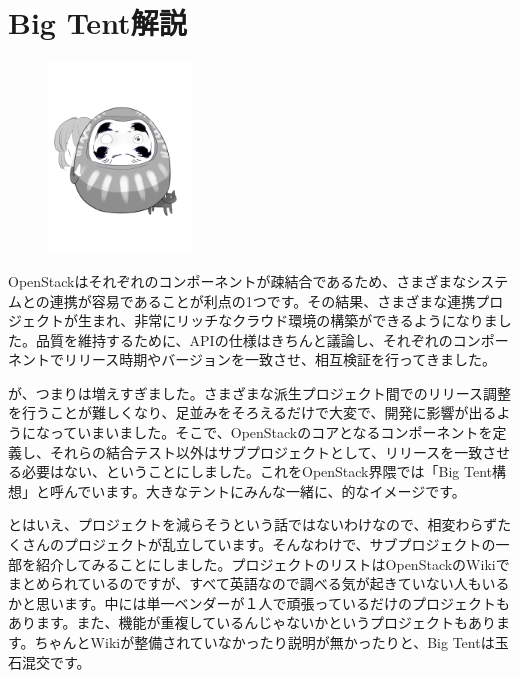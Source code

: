 \chapter{Big Tent解説}

\begin{figure}
	\vspace*{-14\intextsep}
	\begin{center}
		\includegraphics[width=0.34\textwidth]{img/daruma.png}
	\end{center}
\end{figure}

OpenStackはそれぞれのコンポーネントが疎結合であるため、さまざまなシステムとの連携が容易であることが利点の1つです。その結果、さまざまな連携プロジェクトが生まれ、非常にリッチなクラウド環境の構築ができるようになりました。品質を維持するために、APIの仕様はきちんと議論し、それぞれのコンポーネントでリリース時期やバージョンを一致させ、相互検証を行ってきました。

が、つまりは増えすぎました。さまざまな派生プロジェクト間でのリリース調整を行うことが難しくなり、足並みをそろえるだけで大変で、開発に影響が出るようになっていまいました。そこで、OpenStackのコアとなるコンポーネントを定義し、それらの結合テスト以外はサブプロジェクトとして、リリースを一致させる必要はない、ということにしました。これをOpenStack界隈では「Big Tent構想」と呼んでいます。大きなテントにみんな一緒に、的なイメージです。

とはいえ、プロジェクトを減らそうという話ではないわけなので、相変わらずたくさんのプロジェクトが乱立しています。そんなわけで、サブプロジェクトの一部を紹介してみることにしました。プロジェクトのリストはOpenStackのWikiでまとめられているのですが、すべて英語なので調べる気が起きていない人もいるかと思います。中には単一ベンダーが１人で頑張っているだけのプロジェクトもあります。また、機能が重複しているんじゃないかというプロジェクトもあります。ちゃんとWikiが整備されていなかったり説明が無かったりと、Big Tentは玉石混交です。

